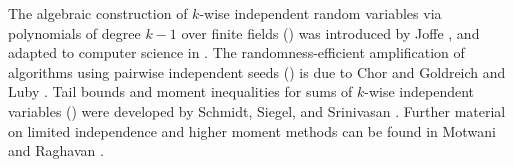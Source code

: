 The algebraic construction of $k$-wise independent random variables
via polynomials of degree $k-1$ over finite fields ()
was introduced by Joffe \cite{j-sadki-71}, and adapted to computer
science in \cite{cw-uchf-79, abi-fsrpa-86}.
The randomness-efficient amplification of  algorithms using
pairwise independent seeds () is due to Chor and
Goldreich \cite{cg-ubwsr-89} and Luby \cite{l-spar-86}.
Tail bounds and moment inequalities for sums of $k$-wise independent
variables () were developed by Schmidt, Siegel, and
Srinivasan \cite{sss-chbal-95}.
Further material on limited independence and higher moment methods can
be found in Motwani and Raghavan \cite[Chapter~3]{mr-ra-95}.

\ChapterEnd{}

   
   
